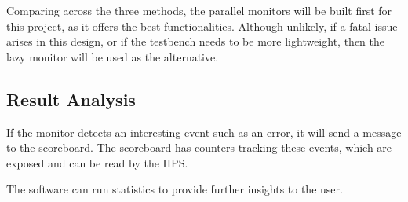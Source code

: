 Comparing across the three methods, the parallel monitors will be built first
for this project, as it offers the best functionalities.
Although unlikely, if a fatal issue arises in this design, or if the testbench
needs to be more lightweight, then the lazy monitor will be used as the
alternative.

\subsection{Result Analysis}
If the monitor detects an interesting event such as an error, it will send
a message to the scoreboard.
The scoreboard has counters tracking these events, which are exposed and can be
read by the HPS.

The software can run statistics to provide further insights to the user.